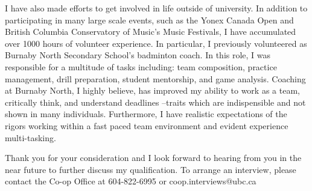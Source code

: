 \documentclass[11pt, a4paper]{awesome-cv}
\begin{document}
\begin{cvletter}
I have also made efforts to get involved in life outside of university. In addition to participating in many large scale events, such as the Yonex Canada Open and British Columbia Conservatory of Music’s Music Festivals, I have accumulated over 1000 hours of volunteer experience. In particular, I previously volunteered as Burnaby North Secondary School’s badminton coach.  In this role, I was responsible for a multitude of tasks including: team composition, practice management, drill preparation, student mentorship, and game analysis.  Coaching at Burnaby North, I highly believe, has improved my ability to work as a team, critically think, and understand deadlines –traits which are indispensible and not shown in many individuals. Furthermore, I have realistic expectations of the rigors working within a fast paced team environment and evident experience multi-tasking. 

Thank you for your consideration and I look forward to hearing from you in the near future to further discuss my qualification. To arrange an interview, please contact the Co-op Office at 604-822-6995 or coop.interviews@ubc.ca


\end{cvletter}


\makeletterclosing
\end{document}
